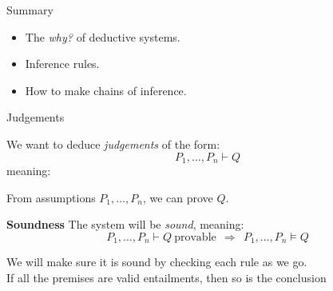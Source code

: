 \documentclass[xetex,aspectratio=169,14pt,hyperref={pdfpagelabels=true,pdflang={en-GB}}]{beamer}
\begin{document}
\begin{frame}[t]
\end{frame}

\begin{frame}
  {Summary}

  \begin{itemize}
  \item The \emph{why?} of deductive systems.
  \item Inference rules.
  \item How to make chains of inference.
  \end{itemize}
\end{frame}



\begin{frame}[t]
  {Judgements}

  We want to deduce \emph{judgements} of the form:
  \begin{displaymath}
    P_1, \dots, P_n \vdash Q
  \end{displaymath}
  meaning:
  \begin{center}
    From assumptions $P_1, \dots, P_n$, we can prove $Q$.
  \end{center}

  \bigskip

  {\bf Soundness}
  The system will be \emph{sound}, meaning:
  \begin{displaymath}
    P_1,\dots,P_n \vdash Q~\textrm{provable}~~\Rightarrow~~P_1, \dots, P_n \models Q
  \end{displaymath}

  We will make sure it is sound by checking each rule as we go. \\
  \quad \textcolor{black!60}{If all the premises are valid entailments, then so is the conclusion}
\end{frame}
\end{document}
